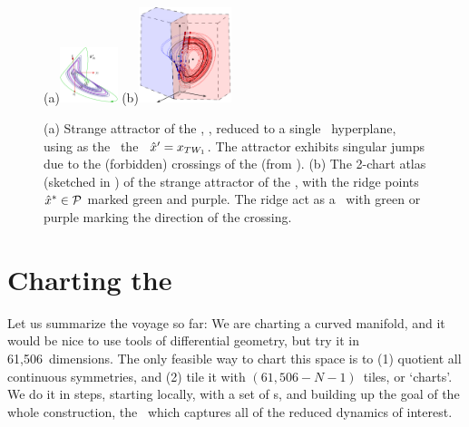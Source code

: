 \documentclass[aip,cha,reprint,
secnumarabic,
nofootinbib, tightenlines,
nobibnotes, showkeys, showpacs,
groupedaddress
]{revtex4-1}
\begin{document}
\begin{figure}
 \begin{center}
(a)\includegraphics[width=0.15\textwidth]{CLEperpReqb}%
(b)\includegraphics[width=0.24\textwidth]{CLE2slice2na}
 \end{center}
  \caption{\label{fig:cLe-2charts}
(a)
Strange attractor of the \cLe, , reduced to a
single \slice\ hyperplane, using as the \template\ the \reqv\ ${\hat{x}'} =
x_{TW_{1}}$. The attractor exhibits singular jumps due to the
(forbidden) crossings of the \chartBord (from ).
(b)
The 2-chart atlas (sketched in ) of the strange
attractor of the \cLe, with the ridge points $\hat{x}^* \in {\cal P}$
marked green and purple. The ridge act as a \PoincSec\ with green or
purple marking the direction of the crossing.
  }
\end{figure}

\section{Charting the \slice}
\label{s:chart}

Let us summarize the voyage so far: We are charting a curved manifold,
and it would be nice to use tools of differential geometry, but try it in
61,506~dimensions. The only feasible way to chart this space is to (1)
quotient all continuous symmetries, and (2) tile it with
$(61,506-N-1)$\dmn\ tiles, or `charts'. We do it in steps, starting
locally, with a set of \template s, and building up the goal of the whole
construction, the \slice\ which captures all of the reduced dynamics of
interest.
\end{document}
